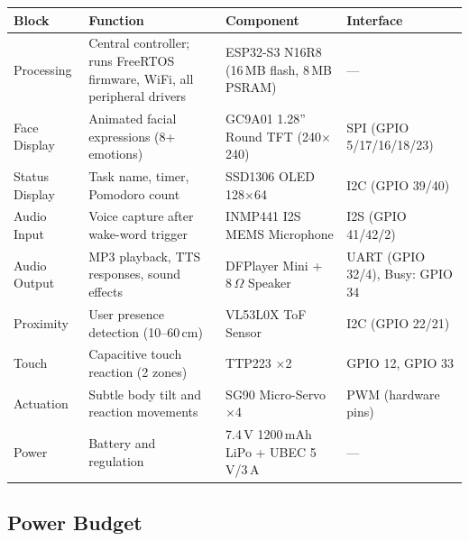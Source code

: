 \documentclass[12pt,a4paper]{article}
\begin{document}
\begin{center}
\label{tab:hwblocks}
\scriptsize
\begin{tabular}{|L{0.15\textwidth}|L{0.30\textwidth}|L{0.22\textwidth}|L{0.20\textwidth}|}
\hline
\textbf{Block} & \textbf{Function} & \textbf{Component} & \textbf{Interface} \\ \hline
Processing & Central controller; runs FreeRTOS firmware, WiFi,
             all peripheral drivers & ESP32-S3 N16R8 (16\,MB flash,
             8\,MB PSRAM) & --- \\ \hline
Face Display & Animated facial expressions (8+ emotions) &
              GC9A01 1.28'' Round TFT (240$\times$240) & SPI (GPIO 5/17/16/18/23) \\ \hline
Status Display & Task name, timer, Pomodoro count &
                SSD1306 OLED 128$\times$64 & I2C (GPIO 39/40) \\ \hline
Audio Input & Voice capture after wake-word trigger &
             INMP441 I2S MEMS Microphone & I2S (GPIO 41/42/2) \\ \hline
Audio Output & MP3 playback, TTS responses, sound effects &
              DFPlayer Mini + 8\,$\Omega$ Speaker & UART (GPIO 32/4),
              Busy: GPIO 34 \\ \hline
Proximity & User presence detection (10--60\,cm) &
           VL53L0X ToF Sensor & I2C (GPIO 22/21) \\ \hline
Touch & Capacitive touch reaction (2 zones) &
       TTP223 $\times$2 & GPIO 12, GPIO 33 \\ \hline
Actuation & Subtle body tilt and reaction movements &
           SG90 Micro-Servo $\times$4 & PWM (hardware pins) \\ \hline
Power & Battery and regulation &
       7.4\,V 1200\,mAh LiPo + UBEC 5\,V/3\,A & --- \\ \hline
\end{tabular}
\end{center}

\subsection{Power Budget}
\end{document}
